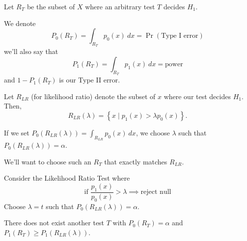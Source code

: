 Let $R_T$ be the subset of $X$ where an arbitrary test $T$ decides $H_1$.

We denote
\[P_0(R_T) = \int_{R_T}p_0(x)\ dx = \Pr(\text{Type I error})\]
we'll also say that
\[P_1(R_T) = \int_{R_T}p_1(x)\ dx = \text{power}\]
and $1-P_1(R_T)$ is our Type II error.

Let $R_{LR}$ (for likelihood ratio) denote the subset of $x$ where our test decides $H_1$. Then,
\[R_{LR}(\lambda) = \left\{ x\mid p_1(x) > \lambda p_0(x) \right\}.\]

If we set $P_0(R_{LR}(\lambda)) = \int_{R_{LR}} p_0(x)\ dx$, we choose $\lambda$ such that $P_0(R_{LR}(\lambda)) = \alpha$.

We'll want to choose such an $R_T$ that exactly matches $R_{LR}$.

\begin{theorem}
    Consider the Likelihood Ratio Test where
    \[\text{if } \frac{p_1(x)}{p_0(x)}>\lambda \implies \text{reject null}\]
    Choose $\lambda = t$ such that $P_0(R_{LR}(\lambda)) = \alpha$.

    There does not exist another test $T$ with $P_0(R_T) = \alpha$ and $P_1(R_T) \geq P_1(R_{LR}(\lambda))$.
\end{theorem}
